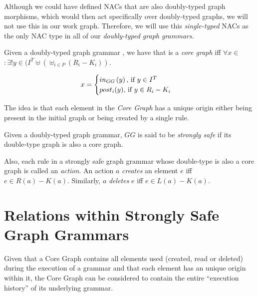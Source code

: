 \begin{remark}
  Although we could have defined NACs that are also doubly-typed graph morphisms, which would then act specifically over doubly-typed graphs, we will not use this in our work graph. Therefore, we will use this \emph{single-typed} NACs as the only NAC type in all of our \emph{doubly-typed graph grammars}.
\end{remark}

\begin{definition} Given a doubly-typed graph grammar \doublyTypedGraphGrammarCore{}, we have that \coreGraph{} is a \emph{core graph} iff \mbox{$\forall x \in$ \coreGraph $: \exists! y \in (I^T \uplus (\uplus_{i \in P} (R_i - K_i))$}.


\[ x =
    \begin{cases}
      in_{GG}\parens{y},$ if $y \in I^T\\
      post_i(y),$ if $y \in R_i - K_i\\
    \end{cases}
   \]

  \begin{intuition} The idea is that each element in the \emph{Core Graph} has a unique origin either being present in the initial graph or being created by a single rule.
\end{intuition}


\end{definition}

\begin{definition} Given \doublyTypedGraphGrammarCore{} a doubly-typed graph grammar, $GG$ is said to be \emph{strongly safe} if its double-type graph is also a core graph.

Also, each rule in a strongly safe graph grammar whose double-type is also a core graph is called an \emph{action}. An action $a$ \emph{creates} an element $e$ iff $e \in R(a) - K(a)$. Similarly, $a$ \emph{deletes} $e$ iff $e \in L(a) - K(a)$.
\end{definition}

\section{Relations within Strongly Safe Graph Grammars}

Given that a Core Graph contains all elements used (created, read or deleted) during the execution of a grammar and that each element has an unique origin within it, the Core Graph can be considered to contain the entire ``execution history'' of its underlying grammar. 

